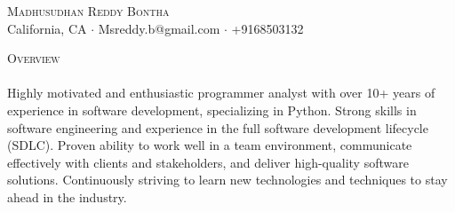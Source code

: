 \documentclass[a4paper]{article}
\newcommand{\lineunder} {
    \vspace*{-8pt} \\
    \hspace*{-18pt} \hrulefill \\
}
\newcommand{\header} [1] {
    {\hspace*{-18pt}\vspace*{6pt} \textsc{#1}}
    \vspace*{-6pt} \lineunder
}
\begin{document}
\vspace*{-40pt}

    

\vspace*{-10pt}
\begin{center}
	{\Huge \scshape {Madhusudhan Reddy Bontha}}\\
	California, CA $\cdot$ Msreddy.b@gmail.com $\cdot$ +9168503132\\
\end{center}

\header{Overview}
\vspace{1mm}
Highly motivated and enthusiastic programmer analyst with over 10+ years of experience in software development, specializing in Python. Strong skills in software engineering and experience in the full software development lifecycle (SDLC). Proven ability to work well in a team environment, communicate effectively with clients and stakeholders, and deliver high-quality software solutions. Continuously striving to learn new technologies and techniques to stay ahead in the industry.
\vspace{2mm}
\end{document}
